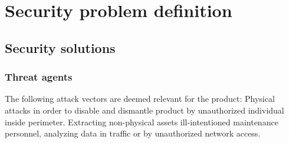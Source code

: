 \documentclass[10pt]{article}
\begin{document}



  \section{Security problem definition}

    \subsection{Security solutions}



     \subsubsection{Threat agents}

      The following attack vectors are deemed relevant for the product:
      Physical attacks in order to disable and dismantle product by
      unauthorized individual inside perimeter. Extracting non-physical
      assets ill-intentioned maintenance personnel, analyzing data in
      traffic or by unauthorized network access.
\end{document}
